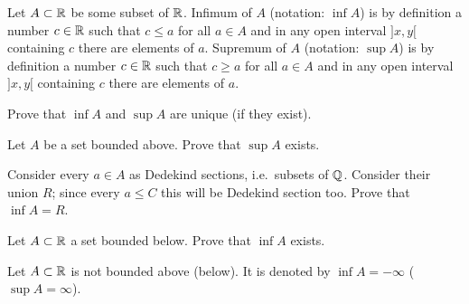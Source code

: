 \documentclass[12pt]{article}
\begin{document}
\begin{opredelenie} Let $A\subset {\mathbb R}$ be some subset of 
${\mathbb R}$. Infimum of $A$ (notation: $\inf A$) is by definition a number $c
\in {\mathbb R}$ such that $c \leq a$ for all $a\in A$ and in any open interval
$]x, y[$ containing $c$ there are elements of $a$. Supremum of $A$
(notation: $\sup A$) is by definition a number $c \in {\mathbb R}$ such that $c
\geq a$ for all $a\in A$ and in any open interval $]x, y[$ containing
$c$ there are elements of $a$.
\end{opredelenie}

\begin{zadacha} Prove that $\inf A$ and $\sup A$ are unique (if they
  exist).
\end{zadacha}

\begin{zadacha}[!] Let $A$ be a set bounded above. Prove that $\sup A$
 exists.
\end{zadacha}

\begin{ukazanie} Consider every $a\in A$ as Dedekind sections,
i.e.\ subsets of ${\mathbb Q}$. Consider their union $R$; since every $a \leq C$
this will be Dedekind section too. Prove that $\inf A = R$.
\end{ukazanie}

\begin{zadacha}[!] Let $A \subset {\mathbb R}$ a set bounded below.
Prove that $\inf A$ exists.
\end{zadacha}

\begin{zamechanie} Let $A\subset {\mathbb R}$ is not bounded above (below).
It is denoted by $\inf A = -\infty$ ($\sup A = \infty$).
\end{zamechanie}
\end{document}
